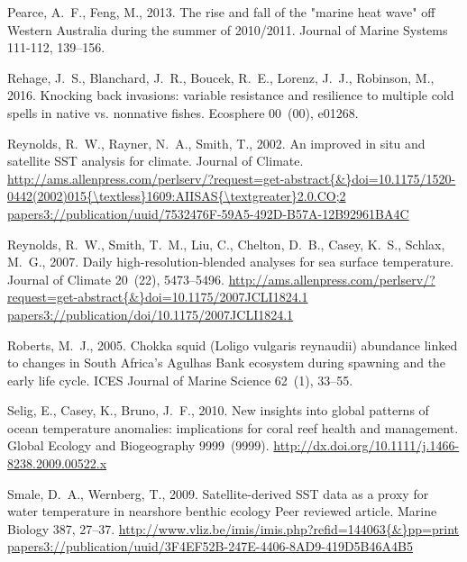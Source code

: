 \documentclass[a4paper,10pt,review]{elsarticle}
\begin{document}
\begin{thebibliography}{50}
Pearce, A.~F., Feng, M., 2013. {The rise and fall of the "marine heat wave" off
  Western Australia during the summer of 2010/2011}. Journal of Marine Systems
  111-112, 139--156.

Rehage, J.~S., Blanchard, J.~R., Boucek, R.~E., Lorenz, J.~J., Robinson, M.,
  2016. {Knocking back invasions: variable resistance and resilience to
  multiple cold spells in native vs. nonnative fishes}. Ecosphere 00~(00),
  e01268.

Reynolds, R.~W., Rayner, N.~A., Smith, T., 2002. {An improved in situ and
  satellite SST analysis for climate}. Journal of Climate.
\newline\urlprefix\url{http://ams.allenpress.com/perlserv/?request=get-abstract{\&}doi=10.1175/1520-0442(2002)015{\textless}1609:AIISAS{\textgreater}2.0.CO;2
  papers3://publication/uuid/7532476F-59A5-492D-B57A-12B92961BA4C}

Reynolds, R.~W., Smith, T.~M., Liu, C., Chelton, D.~B., Casey, K.~S., Schlax,
  M.~G., 2007. {Daily high-resolution-blended analyses for sea surface
  temperature}. Journal of Climate 20~(22), 5473--5496.
\newline\urlprefix\url{http://ams.allenpress.com/perlserv/?request=get-abstract{\&}doi=10.1175/2007JCLI1824.1
  papers3://publication/doi/10.1175/2007JCLI1824.1}

Roberts, M.~J., 2005. {Chokka squid (Loligo vulgaris reynaudii) abundance
  linked to changes in South Africa's Agulhas Bank ecosystem during spawning
  and the early life cycle}. ICES Journal of Marine Science 62~(1), 33--55.

Selig, E., Casey, K., Bruno, J.~F., 2010. {New insights into global patterns of
  ocean temperature anomalies: implications for coral reef health and
  management}. Global Ecology and Biogeography 9999~(9999).
\newline\urlprefix\url{http://dx.doi.org/10.1111/j.1466-8238.2009.00522.x}

Smale, D.~A., Wernberg, T., 2009. {Satellite-derived SST data as a proxy for
  water temperature in nearshore benthic ecology Peer reviewed article}. Marine
  Biology 387, 27--37.
\newline\urlprefix\url{http://www.vliz.be/imis/imis.php?refid=144063{\&}pp=print
  papers3://publication/uuid/3F4EF52B-247E-4406-8AD9-419D5B46A4B5}


\end{thebibliography}
\end{document}
